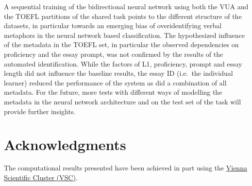 \documentclass[11pt,a4paper]{article}
\begin{document}
 A sequential training of the bidirectional neural network using both the VUA and the TOEFL partitions of the shared task points to the different structure of the datasets, in particular towards an emerging bias of overidentifying verbal metaphors in the neural network based classification. The hypothesized influence of the metadata in the TOEFL set, in particular the observed dependencies on proficiency and the essay prompt, was not confirmed by the results of the automated identification. While the factors of L1, proficiency, prompt and essay length did not influence the baseline results, the essay ID (i.e.~the individual learner) reduced the performance of the system as did a combination of all metadata. For the future, more tests with different ways of modelling the metadata in the neural network architecture and on the test set of the task will provide further insights.


\section*{Acknowledgments}
The computational results presented have been achieved in part using the \href{http://vsc.ac.at}{Vienna Scientific Cluster (VSC)}.

%
%


\end{document}
